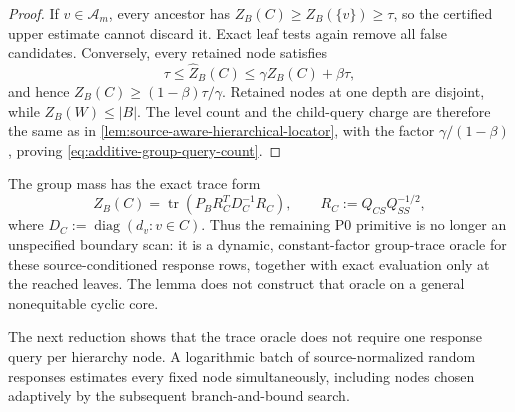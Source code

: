 \begin{proof}
If $v\in\mathcal A_m$, every ancestor has
$Z_B(C)\geq Z_B(\{v\})\geq\tau$, so the certified upper estimate cannot
discard it.  Exact leaf tests again remove all false candidates.  Conversely,
every retained node satisfies
\begin{equation*}
 \tau\leq\widehat Z_B(C)
 \leq\gamma Z_B(C)+\beta\tau,
\end{equation*}
and hence $Z_B(C)\geq(1-\beta)\tau/\gamma$.  Retained nodes at one depth are
disjoint, while $Z_B(W)\leq|B|$.  The level count and the child-query charge
are therefore the same as in
\cref{lem:source-aware-hierarchical-locator}, with the factor
$\gamma/(1-\beta)$, proving
\cref{eq:additive-group-query-count}.
\end{proof}

The group mass has the exact trace form
\begin{equation*}
 Z_B(C)
 =\operatorname{tr}\!\left(
 P_BR_C^TD_C^{-1}R_C
 \right),
 \qquad
 R_C:=Q_{CS}Q_{SS}^{-1/2},
\end{equation*}
where $D_C:=\operatorname{diag}(d_v:v\in C)$.  Thus the remaining P0
primitive is no longer an unspecified boundary scan: it is a dynamic,
constant-factor group-trace oracle for these source-conditioned response
rows, together with exact evaluation only at the reached leaves.  The lemma
does not construct that oracle on a general nonequitable cyclic core.

The next reduction shows that the trace oracle does not require one response
query per hierarchy node.  A logarithmic batch of source-normalized random
responses estimates every fixed node simultaneously, including nodes chosen
adaptively by the subsequent branch-and-bound search.

